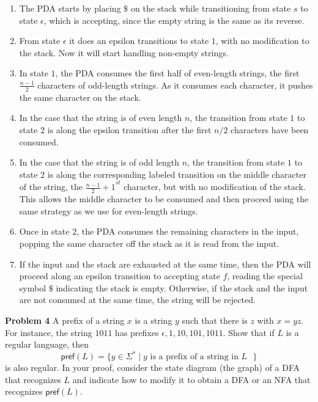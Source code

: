 \documentclass[12pt,letterpaper,final]{report}
\begin{document}
\begin{enumerate}
  \item The PDA starts by placing $\$$ on the stack while transitioning from state $s$ to state $\epsilon$, which is accepting, since the empty string is the same as its reverse.
  \item From state $\epsilon$ it does an epsilon transitions to state $1$, with no modification to the stack. Now it will start handling non-empty strings.
  \item In state $1$, the PDA consumes the first half of even-length strings, the first $\frac{n-1}{2}$ characters of odd-length strings. As it consumes each character, it pushes the same character on the stack.
  \item In the case that the string is of even length $n$, the transition from state $1$ to state $2$ is along the epsilon transition after the first $n/2$ characters have been consumed.
  \item In the case that the string is of odd length $n$, the transition from state $1$ to state $2$ is along the corresponding labeled transition on the middle character of the string, the ${\frac{n-1}{2}+1}^{st}$ character, but with no modification of the stack. This allows the middle character to be consumed and then proceed using the same strategy as we use for even-length strings.
  \item Once in state $2$, the PDA consumes the remaining characters in the input, popping the same character off the stack as it is read from the input.
  \item If the input and the stack are exhausted at the same time, then the PDA will proceed along an epsilon transition to accepting state $f$, reading the special symbol $\$$ indicating the stack is empty. Otherwise, if the stack and the input are not consumed at the same time, the string will be rejected.
\end{enumerate}


\pagebreak
\textbf{Problem 4}  A prefix of a string $x$ is a string $y$ such that there is $z$ with $x=yz$. For instance, the string $1011$ has prefixes $\epsilon, 1, 10, 101, 1011$.  Show that if $L$ is a regular language, then
\[
  \mathsf{pref}(L) = \{y \in \Sigma^* \mid y \textrm{ is a prefix of a string in $L$ } \}
\]
is also regular. In your proof, consider the state diagram (the graph) of a DFA that recognizes $L$ and indicate how to modify it to obtain a DFA or an NFA that recognizes  $\mathsf{pref}(L).$
\end{document}
